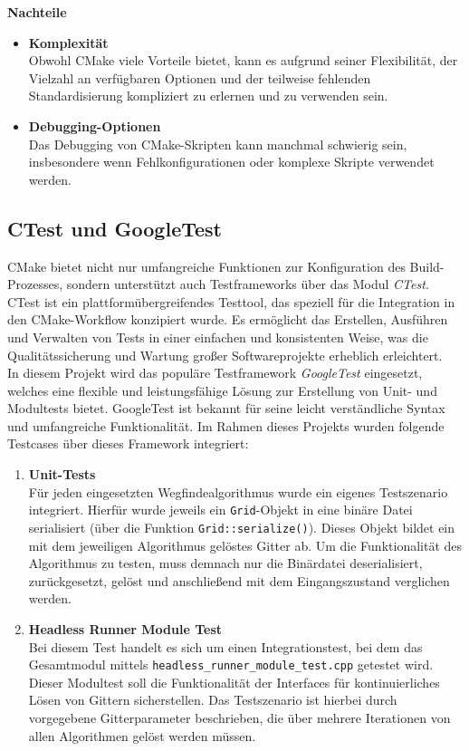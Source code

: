 \newpage
\textbf{Nachteile}
\begin{itemize}
    \item \textbf{Komplexität}\\
    Obwohl CMake viele Vorteile bietet, kann es aufgrund seiner Flexibilität, der Vielzahl an verfügbaren Optionen und der teilweise fehlenden Standardisierung kompliziert zu erlernen und zu verwenden sein.
    \item \textbf{Debugging-Optionen}\\
    Das Debugging von CMake-Skripten kann manchmal schwierig sein, insbesondere wenn Fehlkonfigurationen oder komplexe Skripte verwendet werden.
\end{itemize}

\subsection{CTest und GoogleTest}
\label{subsec:ctest-integration}
CMake bietet nicht nur umfangreiche Funktionen zur Konfiguration des Build-Prozesses, sondern unterstützt auch Testframeworks über das Modul \textit{CTest}.
CTest ist ein plattformübergreifendes Testtool, das speziell für die Integration in den CMake-Workflow konzipiert wurde.
Es ermöglicht das Erstellen, Ausführen und Verwalten von Tests in einer einfachen und konsistenten Weise, was die Qualitätssicherung und Wartung großer Softwareprojekte erheblich erleichtert.\\
In diesem Projekt wird das populäre Testframework \textit{GoogleTest} eingesetzt, welches eine flexible und leistungsfähige Lösung zur Erstellung von Unit- und Modultests bietet.
GoogleTest ist bekannt für seine leicht verständliche Syntax und umfangreiche Funktionalität. \cite{Cmake2024, GTest2024}
Im Rahmen dieses Projekts wurden folgende Testcases über dieses Framework integriert:
\begin{enumerate}
    \item \textbf{Unit-Tests}\\
    Für jeden eingesetzten Wegfindealgorithmus wurde ein eigenes Testszenario integriert.
    Hierfür wurde jeweils ein \texttt{Grid}-Objekt in eine binäre Datei serialisiert (über die Funktion \texttt{Grid::serialize()}).
    Dieses Objekt bildet ein mit dem jeweiligen Algorithmus gelöstes Gitter ab.
    Um die Funktionalität des Algorithmus zu testen, muss demnach nur die Binärdatei deserialisiert, zurückgesetzt, gelöst und anschließend mit dem Eingangszustand verglichen werden.
    \item \textbf{Headless Runner Module Test}\\
    Bei diesem Test handelt es sich um einen Integrationstest, bei dem das Gesamtmodul mittels \texttt{headless\_runner\_module\_test.cpp} getestet wird.
    Dieser Modultest soll die Funktionalität der Interfaces für kontinuierliches Lösen von Gittern sicherstellen.
    Das Testszenario ist hierbei durch vorgegebene Gitterparameter beschrieben, die über mehrere Iterationen von allen Algorithmen gelöst werden müssen.
\end{enumerate}
